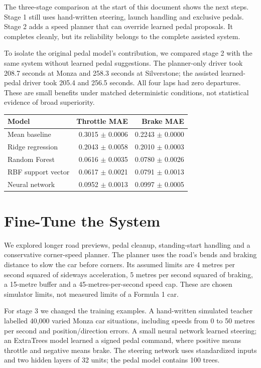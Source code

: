 \documentclass[11pt,a4paper]{article}
\begin{document}
The three-stage comparison at the start of this document shows the next steps. Stage 1 still uses hand-written steering, launch handling and exclusive pedals. Stage 2 adds a speed planner that can override learned pedal proposals. It completes cleanly, but its reliability belongs to the complete assisted system.

To isolate the original pedal model's contribution, we compared stage 2 with the same system without learned pedal suggestions. The planner-only driver took 208.7 seconds at Monza and 258.3 seconds at Silverstone; the assisted learned-pedal driver took 205.4 and 256.5 seconds. All four laps had zero departures. These are small benefits under matched deterministic conditions, not statistical evidence of broad superiority.
\begin{center}\small\begin{tabular}{lrr}\toprule Model & Throttle MAE & Brake MAE\\\midrule
Mean baseline & 0.3015 $\pm$ 0.0006 & 0.2243 $\pm$ 0.0000\\
Ridge regression & 0.2043 $\pm$ 0.0058 & 0.2010 $\pm$ 0.0003\\
Random Forest & 0.0616 $\pm$ 0.0035 & 0.0780 $\pm$ 0.0026\\
RBF support vector & 0.0617 $\pm$ 0.0021 & 0.0791 $\pm$ 0.0013\\
Neural network & 0.0952 $\pm$ 0.0013 & 0.0997 $\pm$ 0.0005\\
\bottomrule\end{tabular}\end{center}
\section{Fine-Tune the System}
We explored longer road previews, pedal cleanup, standing-start handling and a conservative corner-speed planner. The planner uses the road's bends and braking distance to slow the car before corners. Its assumed limits are 4 metres per second squared of sideways acceleration, 5 metres per second squared of braking, a 15-metre buffer and a 45-metres-per-second speed cap. These are chosen simulator limits, not measured limits of a Formula 1 car.

For stage 3 we changed the training examples. A hand-written simulated teacher labelled 40,000 varied Monza car situations, including speeds from 0 to 50 metres per second and position/direction errors. A small neural network learned steering; an ExtraTrees model learned a signed pedal command, where positive means throttle and negative means brake. The steering network uses standardized inputs and two hidden layers of 32 units; the pedal model contains 100 trees.
\end{document}
